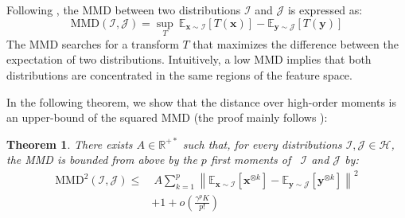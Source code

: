 \documentclass[10pt,twocolumn,letterpaper]{article}
\newtheorem{theorem}{Theorem}
\def\vx{{\bm{x}}}
\def\vy{{\bm{y}}}
\def\sR{{\mathbb{R}}}
\newcommand{\E}{\mathbb{E}}
\begin{document}
        Following \cite{Gretton_2007_NIPS}, the MMD between two distributions $\mathcal{I}$ and $\mathcal{J}$ is expressed as:
        \begin{equation}
            \text{MMD}(\mathcal{I},\mathcal{J}) = \underset{T}{\sup} \ \E_{\vx \sim \mathcal{I}}[T(\vx)] - \E_{\vy \sim \mathcal{J}}[T(\vy)]
        \end{equation}
        The MMD searches for a transform $T$ that maximizes the difference between the expectation of two distributions.
        Intuitively, a low MMD implies that both distributions are concentrated in the same regions of the feature space.
        
        In the following theorem, we show that the distance over high-order moments is an upper-bound of the squared MMD (the proof mainly follows \cite{Gretton_2007_NIPS}):
        
        \begin{theorem}\label{th:upper_bound}
            There exists $A \in \sR^{+*}$ such that, for every distributions $\mathcal{I}, \mathcal{J} \in \mathcal{H}$, the MMD is bounded from above by the $p$ first moments of \ $\mathcal{I}$ and $\mathcal{J}$ by:
            \begin{align}
                \nonumber \text{MMD}^2(\mathcal{I}, \mathcal{J}) \leq & \ A \sum_{k=1}^p \left\|\E_{\vx\sim \mathcal{I}}[\vx^{\otimes k}] - \E_{\vy\sim \mathcal{J}}[\vy^{\otimes k}]\right\|^2 \\
                & + 1 + o(\frac{\gamma^p K}{p!})
            \end{align}
        \end{theorem}
        
\end{document}
